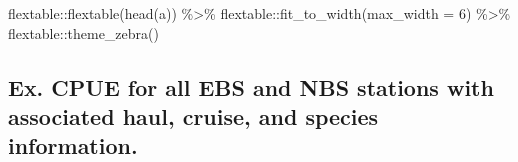 \documentclass[
  letterpaper,
  oneside,
  open=any]{scrbook}
\newenvironment{Shaded}{\begin{snugshade}}{\end{snugshade}}
\newcommand{\AttributeTok}[1]{\textcolor[rgb]{0.40,0.45,0.13}{#1}}
\newcommand{\DecValTok}[1]{\textcolor[rgb]{0.68,0.00,0.00}{#1}}
\newcommand{\FunctionTok}[1]{\textcolor[rgb]{0.28,0.35,0.67}{#1}}
\newcommand{\NormalTok}[1]{\textcolor[rgb]{0.00,0.23,0.31}{#1}}
\newcommand{\SpecialCharTok}[1]{\textcolor[rgb]{0.37,0.37,0.37}{#1}}
\begin{document}
\begin{Shaded}
\begin{Highlighting}[]
\NormalTok{flextable}\SpecialCharTok{::}\FunctionTok{flextable}\NormalTok{(}\FunctionTok{head}\NormalTok{(a)) }\SpecialCharTok{\%\textgreater{}\%} 
\NormalTok{  flextable}\SpecialCharTok{::}\FunctionTok{fit\_to\_width}\NormalTok{(}\AttributeTok{max\_width =} \DecValTok{6}\NormalTok{) }\SpecialCharTok{\%\textgreater{}\%} 
\NormalTok{  flextable}\SpecialCharTok{::}\FunctionTok{theme\_zebra}\NormalTok{()}
\end{Highlighting}
\end{Shaded}

\hypertarget{ex.-cpue-for-all-ebs-and-nbs-stations-with-associated-haul-cruise-and-species-information.}{%
\subsection{Ex. CPUE for all EBS and NBS stations with associated haul,
cruise, and species
information.}\label{ex.-cpue-for-all-ebs-and-nbs-stations-with-associated-haul-cruise-and-species-information.}}
\end{document}
